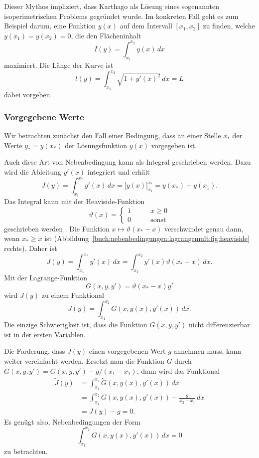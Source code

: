 Dieser Mythos impliziert, dass Karthago als Lösung eines sogenannten
isoperimetrischen Problems gegründet wurde.
%
Im konkreten Fall geht es zum Beispiel darum, eine Funktion $y(x)$
auf dem Intervall $[x_1,x_2]$ zu finden, welche $y(x_1)=y(x_2)=0$,
die den Flächeninhalt
\[
I(y)
=
\int_{x_1}^{x_2} y(x)\,dx
\]
maximiert.
Die Länge der Kurve ist
\[
l(y)
=
\int_{x_1}^{x_2}
\sqrt{1+y'(x)^2}
\,dx
=
L
\]
dabei vorgeben.

%
%
\subsubsection{Vorgegebene Werte}
Wir betrachten zunächst den Fall einer Bedingung, dass an einer Stelle
$x_*$ der Werte $y_*=y(x_*)$ der Lösungsfunktion $y(x)$ vorgegeben ist.

Auch diese Art von Nebenbedingung kann als Integral geschrieben werden.
Dazu wird die Ableitung $y'(x)$ integriert und erhält
\[
J(y)
=
\int_{x_1}^{x_*} y'(x)\,dx
=
\biggl[y(x)\biggr]_{x_1}^{x_*}
=
y(x_*)-y(x_1).
\]
Das Integral kann mit der Heaviside-Funktion
\begin{equation}
\vartheta(x)
=
\begin{cases}
1&\qquad x\ge 0\\
0&\qquad\text{sonst}
\end{cases}
\label{buch:nebenbedingungen:lagrangemult:eqn:heaviside}
\end{equation}
geschrieben werden%
.
Die Funktion $x\mapsto\vartheta(x_*-x)$ verschwindet genau dann,
wenn $x_*\ge x$ ist
(Abbildung~\ref{buch:nebenbedingungen:lagrangemult:fig:heaviside} rechts).
Daher ist
\[
J(y)
=
\int_{x_1}^{x_*} y'(x)\,dx
=
\int_{x_1}^{x_2} y'(x)\vartheta(x_*-x)\,dx.
\]
Mit der Lagrange-Funktion
\begin{equation}
G(x,y,y')
=
\vartheta(x_*-x)
y'
\label{buch:nebenbedingungen:lagrangemult:eqn:heavilagrange}
\end{equation}
wird $J(y)$ zu einem Funktional
\[
J(y)
=
\int_{x_1}^{x_2}
G(x,y(x),y'(x))
\,dx.
\]
Die einzige Schwierigkeit ist, dass die Funktion $G(x,y,y')$ nicht
differenzierbar ist in der ersten Variablen.

Die Forderung, dass $J(y)$ einen vorgegebenen Wert $g$ annehmen muss,
kann weiter vereinfacht werden.
Ersetzt man die Funktion $G$ durch $\tilde{G}(x,y,y')=G(x,y,y')-g/(x_1-x_1)$,
dann wird das Funktional
\begin{align*}
\tilde{J}(y)
&=
\int_{x_1}^{x_2}
\tilde{G}(x,y(x),y'(x))\,dx
\\
&=
\int_{x_1}^{x_2} G(x,y(x),y'(x)) - \frac{g}{x_2-x_1}\,dx
\\
&=
J(y) - g
=
0.
\end{align*}
Es genügt also, Nebenbedingungen der Form
\[
\int_{x_1}^{x_2} G(x,y(x),y'(x))\,dx = 0
\]
zu betrachten.

